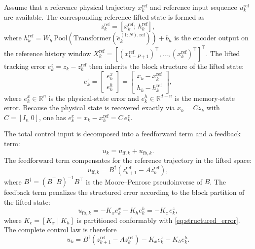 \documentclass[journal]{IEEEtran}
\begin{document}
Assume that a reference physical trajectory $x_k^{\mathrm{ref}}$ and reference input sequence $u_k^{\mathrm{ref}}$ are available. The corresponding reference lifted state is formed as
\begin{equation}
    z_k^{\mathrm{ref}} = [x_k^{\mathrm{ref}};\, h_k^{\mathrm{ref}}],
    \label{eq:ref_lifted}
\end{equation}
where $h_k^{\mathrm{ref}} = W_h\,\mathrm{Pool}\!\left(\mathrm{Transformer}(\tilde{e}^{(1:N),\mathrm{ref}}_k)\right) + b_h$ is the encoder output on the reference history window $X_k^{\mathrm{ref}} = [(x_{k-P+1}^{\mathrm{ref}})^\top,\ldots,(x_k^{\mathrm{ref}})^\top]^\top$. The lifted tracking error $e_k^z = z_k - z_k^{\mathrm{ref}}$ then inherits the block structure of the lifted state:
\begin{equation}
    e_k^z = \begin{bmatrix} e_k^x \\ e_k^h \end{bmatrix}
           = \begin{bmatrix} x_k - x_k^{\mathrm{ref}} \\ h_k - h_k^{\mathrm{ref}} \end{bmatrix},
    \label{eq:structured_error}
\end{equation}
where $e_k^x \in \mathbb{R}^n$ is the physical-state error and $e_k^h \in \mathbb{R}^{d-n}$ is the memory-state error. Because the physical state is recovered exactly via $x_k = Cz_k$ with $C=[I_n\;0]$, one has $e_k^x = x_k - x_k^{\mathrm{ref}} = C\,e_k^z$.

The total control input is decomposed into a feedforward term and a feedback term:
\begin{equation}
    u_k = u_{\mathrm{ff},k} + u_{\mathrm{fb},k}.
    \label{eq:ctrl_decomp}
\end{equation}
The feedforward term compensates for the reference trajectory in the lifted space:
\begin{equation}
    u_{\mathrm{ff},k} = B^\dagger\!\left(z_{k+1}^{\mathrm{ref}} - A z_k^{\mathrm{ref}}\right),
    \label{eq:feedforward}
\end{equation}
where $B^\dagger = (B^\top B)^{-1}B^\top$ is the Moore--Penrose pseudoinverse of $B$. The feedback term penalizes the structured error according to the block partition of the lifted state:
\begin{equation}
    u_{\mathrm{fb},k} = -K_x e_k^x - K_h e_k^h = -K_c\, e_k^z,
    \label{eq:hierarchical_fb}
\end{equation}
where $K_c = [K_x\;|\;K_h]$ is partitioned conformably with \eqref{eq:structured_error}. The complete control law is therefore
\begin{equation}
    u_k = B^\dagger\!\left(z_{k+1}^{\mathrm{ref}} - A z_k^{\mathrm{ref}}\right) - K_x e_k^x - K_h e_k^h.
    \label{eq:full_ctrl}
\end{equation}
\end{document}

